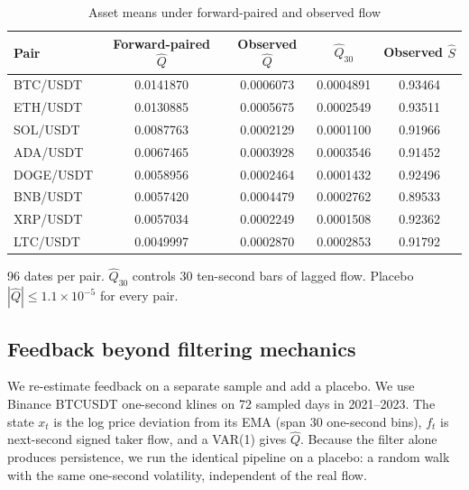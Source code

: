 \documentclass[12pt]{article}
\theoremstyle{definition}
\theoremstyle{remark}
\begin{document}
\begin{table}[t]\centering\small
\begin{threeparttable}
\caption{Asset means under forward-paired and observed flow}\label{tab:assets}
\begin{tabular}{lcccc}
\toprule
Pair & Forward-paired $\hat Q$ & Observed $\hat Q$ & $\hat Q_{30}$ & Observed $\hat S$\\
\midrule
BTC/USDT & 0.0141870 & 0.0006073 & 0.0004891 & 0.93464\\
ETH/USDT & 0.0130885 & 0.0005675 & 0.0002549 & 0.93511\\
SOL/USDT & 0.0087763 & 0.0002129 & 0.0001100 & 0.91966\\
ADA/USDT & 0.0067465 & 0.0003928 & 0.0003546 & 0.91452\\
DOGE/USDT & 0.0058956 & 0.0002464 & 0.0001432 & 0.92496\\
BNB/USDT & 0.0057420 & 0.0004479 & 0.0002762 & 0.89533\\
XRP/USDT & 0.0057034 & 0.0002249 & 0.0001508 & 0.92362\\
LTC/USDT & 0.0049997 & 0.0002870 & 0.0002853 & 0.91792\\
\bottomrule
\end{tabular}
\begin{tablenotes}\footnotesize\item 96 dates per pair. $\hat Q_{30}$ controls 30 ten-second bars of lagged flow. Placebo $|\hat Q|\le1.1\times10^{-5}$ for every pair. \end{tablenotes}
\end{threeparttable}
\end{table}



\subsection{Feedback beyond filtering mechanics}

We re-estimate feedback on a separate sample and add a placebo. We use Binance BTCUSDT one-second klines on 72 sampled days in 2021--2023. The state $x_t$ is the log price deviation from its EMA (span 30 one-second bins), $f_t$ is next-second signed taker flow, and a VAR(1) gives $\hat Q$. Because the filter alone produces persistence, we run the identical pipeline on a placebo: a random walk with the same one-second volatility, independent of the real flow.
\end{document}
